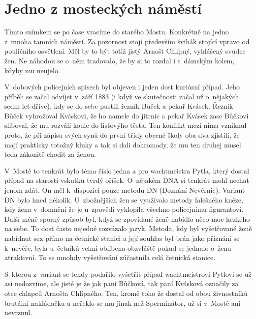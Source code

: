 
\chapter{Jedno z mosteckých náměstí}

Tímto snímkem se po čase vracíme do starého Mostu. Konkrétně na jedno z~mnoha
tamních náměstí. Za pozornost stojí především švihák stojící vpravo od
pouličního osvětlení. Měl by to být totiž jistý Arnošt Chlípný, vyhlášený
svůdce žen. Ne náhodou se o~něm tradovalo, že by si to rozdal i s~dámským
kolem, kdyby mu neujelo.

V~dobových policejních spisech byl objeven i jeden dost kuriózní případ. Jeho
příběh se začal odvíjet v~září 1883 (i když ve skutečnosti začal už o~nějakých
sedm let dříve), kdy se do sebe pustili řezník Bůček a pekař Kvásek. Řezník
Bůček vyhrožoval Kváskovi, že ho namele do jitrnic a pekař Kvásek zase Bůčkovi
sliboval, že mu rozválí koule do listovýho těsta. Ten konflikt mezi nima
vzniknul proto, že při zápisu svých synů do první třídy obecné školy oba dva
zjistili, že mají prakticky totožný kluky a tak si dali dohromady, že mu ten
druhej musel teda zákonitě chodit za ženou.

V~Mostě to tenkrát bylo téma číslo jedna a pro wachtmeistra Pytla, který dostal
případ na starosti vskutku tvrdý oříšek. O~nějakém DNA si tenkrát mohl nechat
jenom zdát. On měl k~dispozici pouze metodu DN (Doznání Nevěrnic). Variant DN
bylo hned několik. U~zbožnějších žen se využívalo metody falešného kněze, kdy
žena v~domnění že je u~zpovědi vyklopila všechno policejnímu figurantovi. Další
méně sporný způsob byl, když se zpovídané ženě nabídlo něco moc hezkého na
sebe. To dost často nejedné rozvázalo jazyk. Metoda, kdy byl vyšetřované ženě
nabídnut sex přímo na četnické stanici a její souhlas byl brán jako přiznání se
k~nevěře, byla u~četníků velmi oblíbena obzvláště pokud se jednalo o~ženu
atraktivní. To se mnohdy vyšetřování zúčastnila celá četnická stanice.

S~kterou z~variant se tehdy podařilo vyšetřit případ wachtmeistrovi Pytlovi se
už asi nedozvíme, ale jisté je že jak paní Bůčková, tak paní Kvásková označily
za otce chlapců Arnošta Chlípného. Ten, kromě toho že dostal od obou
živnostníků brutální nakládačku a neřeklo se mu jinak než Sperminátor, už si
v~Mostě ani nevrznul.

